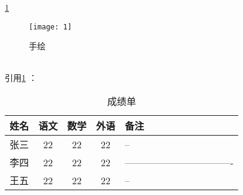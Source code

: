 ﻿\documentclass{ctexart}
\begin{document}
    \ref{fig-pic}
    \begin{figure}[htbp]%
        \centering  %
        \caption{手绘}\label{fig-pic}
        \texttt{[image: 1]}\\
    \end{figure}\\
    引用\ref{tab-score}
    ：
    \begin{table}
        \centering
        \caption{成绩单}\label{tab-score}
        \begin{tabular}{|l||c|c|c|p{1.5cm}|}%
            \hline
            姓名 & 语文 & 数学 & 外语 & 备注\\
            \hline \hline
            张三 & 22 & 22 & 22  &--         \\ 
            \hline
            李四 & 22 & 22 & 22  &----------------------------------  \\
            \hline
            王五 & 22 & 22 & 22  &--      \\
            \hline 
        \end{tabular}
    \end{table}
\end{document}
